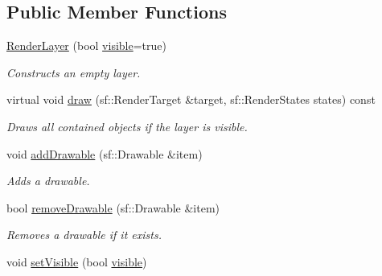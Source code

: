 \subsection*{Public Member Functions}
\begin{DoxyCompactItemize}
\item 
\mbox{\label{classzt_1_1_render_layer_ab612013a9d82ccbe66a7d86b2eb474f2}} 
\hyperlink{classzt_1_1_render_layer_ab612013a9d82ccbe66a7d86b2eb474f2}{Render\+Layer} (bool \hyperlink{classzt_1_1_render_layer_a5a6dc2d742807bad7533992512d060b4}{visible}=true)
\begin{DoxyCompactList}\small\item\em Constructs an empty layer. \end{DoxyCompactList}\item 
\mbox{\label{classzt_1_1_render_layer_aa1ffedae44104604d9b1ffac7349d181}} 
virtual void \hyperlink{classzt_1_1_render_layer_aa1ffedae44104604d9b1ffac7349d181}{draw} (sf\+::\+Render\+Target \&target, sf\+::\+Render\+States states) const
\begin{DoxyCompactList}\small\item\em Draws all contained objects if the layer is visible. \end{DoxyCompactList}\item 
\mbox{\label{classzt_1_1_render_layer_a3495a2e7991826fb6459381cd483c96b}} 
void \hyperlink{classzt_1_1_render_layer_a3495a2e7991826fb6459381cd483c96b}{add\+Drawable} (sf\+::\+Drawable \&item)
\begin{DoxyCompactList}\small\item\em Adds a drawable. \end{DoxyCompactList}\item 
bool \hyperlink{classzt_1_1_render_layer_a7273e706c4f0a727cc363a02b762ebe3}{remove\+Drawable} (sf\+::\+Drawable \&item)
\begin{DoxyCompactList}\small\item\em Removes a drawable if it exists. \end{DoxyCompactList}\item 
\mbox{\label{classzt_1_1_render_layer_a93bcd3f29fc6af62bd92ecf670c6368a}} 
void \hyperlink{classzt_1_1_render_layer_a93bcd3f29fc6af62bd92ecf670c6368a}{set\+Visible} (bool \hyperlink{classzt_1_1_render_layer_a5a6dc2d742807bad7533992512d060b4}{visible})

\end{DoxyCompactItemize}
